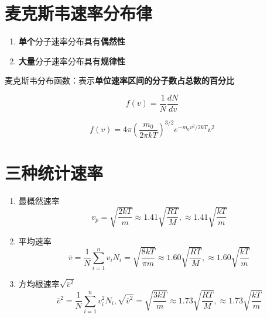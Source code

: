 \section{麦克斯韦速率分布律}

\begin{enumerate}
    \item \textbf{单个}分子速率分布具有\textbf{偶然性}
    \item \textbf{大量}分子速率分布具有\textbf{规律性}
\end{enumerate}

麦克斯韦分布函数：表示\textbf{单位速率区间的分子数占总数的百分比}

\begin{equation}
    f(v)=\frac{1}{N}\frac{dN}{dv}
\end{equation}

\begin{equation}
    f(v)=4\pi \left(\frac{m_0}{2\pi kT}\right)^{3/2}e^{-m_0v^2/2kT}v^2
\end{equation}

\section{三种统计速率}

\begin{enumerate}

    \item 最概然速率
          \begin{equation}
              v_p=\sqrt{\frac{2kT}{m}}\approx 1.41\sqrt{\frac{RT}{M}},\approx 1.41\sqrt{\frac{kT}{m}}
          \end{equation}

    \item 平均速率
          \begin{equation}
              \overline {v}=\frac{1}{N}\sum_{i=1}^n{v_iN_i}=\sqrt{\frac{8kT}{\pi m}}\approx 1.60\sqrt{\frac{RT}{M}},\approx 1.60\sqrt{\frac{kT}{m}}
          \end{equation}

    \item 方均根速率$\sqrt{\overline{v}^2}$
          \begin{equation}
              \overline{v}^2=\frac{1}{N}\sum_{i=1}^n{v_i^2N_i},\sqrt{\overline{v}^2}=\sqrt{\frac{3kT}{m}}\approx 1.73\sqrt{\frac{RT}{M}},\approx 1.73\sqrt{\frac{kT}{m}}
          \end{equation}

\end{enumerate}

